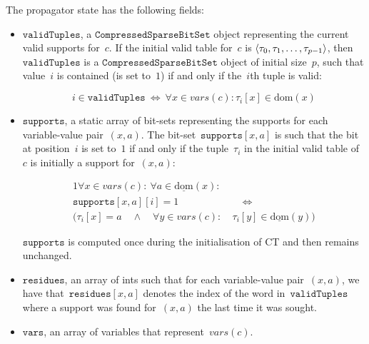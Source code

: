 \documentclass[a4paper,11pt]{article}
\newcommand{\Dom}[1]{\text{dom}({#1})}
\newcommand{\Dominit}[1]{\underline{\text{dom}}(#1)}
\newcommand{\Words}{\texttt{words}}
\newcommand{\SparseBitSet}{\texttt{CompressedSparseBitSet}}
\newcommand{\CurrTable}{\texttt{validTuples}}
\newcommand{\Supports}{\texttt{supports}}
\newcommand{\Residues}{\texttt{residues}}
\newcommand{\Vars}{\texttt{vars}}
\numberwithin{equation}{section}
\begin{document}
The propagator state has the following fields:

\begin{itemize}
  
  \item $\CurrTable$, a $\SparseBitSet$ object representing the current valid
    supports for~$c$. If the initial valid table for~$c$
    is $\left\langle\tau_0, \tau_1, \ldots, \tau_{p-1}\right\rangle$,
    then~$\CurrTable$ is a 
    $\SparseBitSet$ object of initial size~$p$, such that value~$i$
    is contained (is set to~$1$) if and only if the~$i$th tuple is valid:
    
    \begin{equation} \label{eq:currtable}
      i \in \CurrTable \ \Leftrightarrow \ \forall x \in \mathit{vars}(c): \tau_i[x] \in \Dom{x}
    \end{equation}

  \item $\Supports$, a static array of bit-sets representing
    the supports for each variable-value pair~$(x,a)$.
    The bit-set~$\Supports[x,a]$ is such that
    the bit at position~$i$ is set to~$1$ if and only if the 
    tuple~$\tau_i$ in the initial valid table of~$c$ is initially a support for~$(x,a)$:

    \begin{alignat}{1}
      \forall x \in \mathit{vars}(c): \ \forall a \in \Dominit{x}:& \\
      \Supports[x,a][i] = 1 &\quad \Leftrightarrow \\
      (\tau_i[x] = a \quad \land \quad
      \forall y \in \mathit{vars}(c): \ &\tau_i[y] \in \Dominit{y})
    \end{alignat}

    $\Supports$ is computed once during the initialisation of CT and then
    remains unchanged.
    
  \item $\Residues$, an array of ints such that for each variable-value pair~$(x,a)$,
    we have that~$\Residues[x,a]$ denotes the index
    of the word in~$\CurrTable$
    where a support was found for~$(x,a)$ the last time it was sought.

  \item $\Vars$, an array of variables that represent~$\mathit{vars}(c)$.

\end{itemize}
\end{document}
